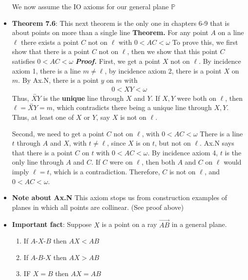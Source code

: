 \documentclass{report}
\begin{document}
\begin{itemize}
            We now assume the IO axioms for our general plane $\mathbb{P}$
        \item \textbf{Theorem 7.6}: This next theorem is the only one in chapters 6-9 that is about points on more than a single line
            \bigbreak \noindent 
            \textbf{Theorem.} For any point $A$ on a line $\ell$ there exists a point $C$ not on $\ell$ with $0 < AC <\omega$ 
            \bigbreak \noindent 
            To prove this, we first show that there is a point $C$ not on $\ell$, then we show that this point $C$ satisfies $0 < AC < \omega$
            \bigbreak \noindent 
            \textbf{\textit{Proof.}}
            \bigbreak \noindent 
            First, we get a point $X$ not on $\ell$. By incidence axiom 1, there is a line $m \ne \ell$, by incidence axiom 2, there is a point $X$ on $m$. By Ax.N, there is a point $y$ on $m$ with 
            \begin{align*}
                0 < XY < \omega
            \end{align*}
            Thus, $\overleftrightarrow{XY} $ is the \textbf{unique} line through $X$ and $Y$. If $X,Y$ were both on $\ell$, then $\ell = \overleftrightarrow{XY} = m$, which contradicts there being a unique line through $X,Y$. Thus, at least one of $X$ or $Y$, say $X$ is not on $\ell$.
            \bigbreak \noindent 
            \begin{figure}[ht]
                \centering
                \label{fig:fig123}
            \end{figure}
            \bigbreak \noindent 
            Second, we need to get a point $C$ not on $\ell$, with $0 < AC < \omega$
            \bigbreak \noindent 
            There is a line $t$ through $A$ and $X$, with $t\ne \ell$, since $X$ is on $t$, but not on $\ell$. Ax.N says that there is a point $C$ on $t$ with $0 < AC < \omega$. By incidence axiom 4, $t$ is the only line through $A$ and $C$. If $C$ were on $\ell$, then both $A$ and $C$ on $\ell$ would imply $\ell = t$, which is a contradiction.
            \bigbreak \noindent 
            Therefore, $C$ is not on $\ell$, and $0 < AC < \omega$.
            \bigbreak \noindent 
\begin{figure}[ht]
    \centering
    \label{fig:fig12}
\end{figure}
        \item \textbf{Note about Ax.N} This axiom stops us from construction examples of planes in which all points are collinear. (See proof above)
        \item \textbf{Important fact}:  Suppose $X$ is a point on a ray $\overrightarrow{AB}$ in a general plane.
            \begin{enumerate}
                \item If $ A\text{-}X\text{-}B$ then $AX < AB $
                \item If $ A\text{-}B\text{-}X$ then $AX > AB $
                \item IF $X = B$ then $AX = AB$
            \end{enumerate}


    \end{itemize}
\end{document}
